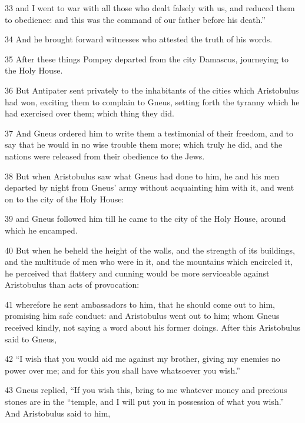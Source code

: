 \par 33 and I went to war with all those who dealt falsely with us, and reduced them to obedience: and this was the command of our father before his death.” 

\par 34 And he brought forward witnesses who attested the truth of his words. 

\par 35 After these things Pompey departed from the city Damascus, journeying to the Holy House. 

\par 36 But Antipater sent privately to the inhabitants of the cities which Aristobulus had won, exciting them to complain to Gneus, setting forth the tyranny which he had exercised over them; which thing they did. 

\par 37 And Gneus ordered him to write them a testimonial of their freedom, and to say that he would in no wise trouble them more; which truly he did, and the nations were released from their obedience to the Jews. 

\par 38 But when Aristobulus saw what Gneus had done to him, he and his men departed by night from Gneus’ army without acquainting him with it, and went on to the city of the Holy House: 

\par 39 and Gneus followed him till he came to the city of the Holy House, around which he encamped. 

\par 40 But when he beheld the height of the walls, and the strength of its buildings, and the multitude of men who were in it, and the mountains which encircled it, he perceived that flattery and cunning would be more serviceable against Aristobulus than acts of provocation: 

\par 41 wherefore he sent ambassadors to him, that he should come out to him, promising him safe conduct: and Aristobulus went out to him; whom Gneus received kindly, not saying a word about his former doings. After this Aristobulus said to Gneus, 

\par 42 “I wish that you would aid me against my brother, giving my enemies no power over me; and for this you shall have whatsoever you wish.” 

\par 43 Gneus replied, “If you wish this, bring to me whatever money and precious stones are in the “temple, and I will put you in possession of what you wish.” And Aristobulus said to him, 

